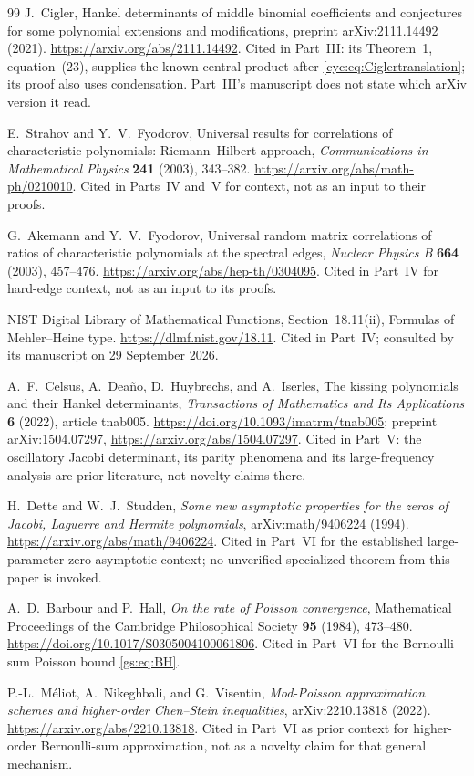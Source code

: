 \documentclass[11pt,a4paper]{article}
\numberwithin{equation}{section}
\theoremstyle{definition}
\theoremstyle{remark}
\begin{document}
\begin{thebibliography}{99}
J.~Cigler,
Hankel determinants of middle binomial coefficients and conjectures for
some polynomial extensions and modifications, preprint arXiv:2111.14492
(2021).
\url{https://arxiv.org/abs/2111.14492}.
Cited in Part~III: its Theorem~1, equation~(23), supplies the known
central product after \eqref{cyc:eq:Ciglertranslation}; its proof also
uses condensation.  Part~III's manuscript does not state which arXiv
version it read.

E.~Strahov and Y.~V.~Fyodorov,
Universal results for correlations of characteristic polynomials:
Riemann--Hilbert approach,
\emph{Communications in Mathematical Physics} \textbf{241} (2003), 343--382.
\url{https://arxiv.org/abs/math-ph/0210010}.
Cited in Parts~IV and~V for context, not as an input to their proofs.

G.~Akemann and Y.~V.~Fyodorov,
Universal random matrix correlations of ratios of characteristic
polynomials at the spectral edges,
\emph{Nuclear Physics B} \textbf{664} (2003), 457--476.
\url{https://arxiv.org/abs/hep-th/0304095}.
Cited in Part~IV for hard-edge context, not as an input to its proofs.

NIST Digital Library of Mathematical Functions,
Section~18.11(ii), Formulas of Mehler--Heine type.
\url{https://dlmf.nist.gov/18.11}.
Cited in Part~IV; consulted by its manuscript on 29 September 2026.

A.~F.~Celsus, A.~Dea\~no, D.~Huybrechs, and A.~Iserles,
The kissing polynomials and their Hankel determinants,
\emph{Transactions of Mathematics and Its Applications} \textbf{6} (2022),
article tnab005.
\url{https://doi.org/10.1093/imatrm/tnab005}; preprint arXiv:1504.07297,
\url{https://arxiv.org/abs/1504.07297}.
Cited in Part~V: the oscillatory Jacobi determinant, its parity phenomena
and its large-frequency analysis are prior literature, not novelty claims
there.

H.~Dette and W.~J.~Studden,
\emph{Some new asymptotic properties for the zeros of Jacobi, Laguerre and
Hermite polynomials}, arXiv:math/9406224 (1994).
\url{https://arxiv.org/abs/math/9406224}.
Cited in Part~VI for the established large-parameter zero-asymptotic
context; no unverified specialized theorem from this paper is invoked.

A.~D.~Barbour and P.~Hall,
\emph{On the rate of Poisson convergence},
Mathematical Proceedings of the Cambridge Philosophical Society
\textbf{95} (1984), 473--480.
\url{https://doi.org/10.1017/S0305004100061806}.
Cited in Part~VI for the Bernoulli-sum Poisson bound \eqref{gs:eq:BH}.

P.-L.~M\'eliot, A.~Nikeghbali, and G.~Visentin,
\emph{Mod-Poisson approximation schemes and higher-order Chen--Stein
inequalities}, arXiv:2210.13818 (2022).
\url{https://arxiv.org/abs/2210.13818}.
Cited in Part~VI as prior context for higher-order Bernoulli-sum
approximation, not as a novelty claim for that general mechanism.

\end{thebibliography}
\end{document}
